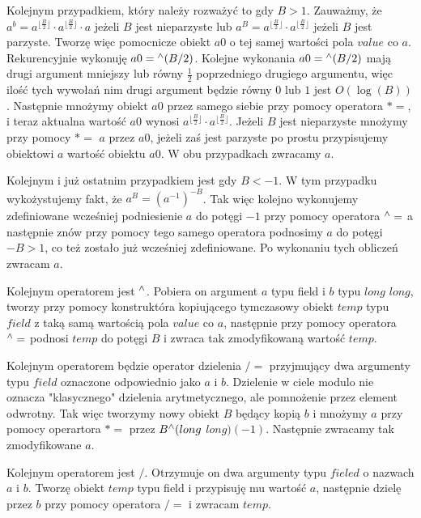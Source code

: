 \documentclass{article}
\begin{document}
Kolejnym przypadkiem, który należy rozważyć to gdy $B>1$. Zauważmy, że $a^b=a^{\lfloor\frac{B}{2} \rfloor} \cdot a^{\lfloor\frac{B}{2} \rfloor} \cdot a$
jeżeli $B$ jest nieparzyste lub $a^B=a^{\lfloor\frac{B}{2} \rfloor} \cdot a^{\lfloor\frac{B}{2} \rfloor}$ jeżeli $B$ jest parzyste.
Tworzę więc pomocnicze obiekt $a0$ o tej samej wartości pola $value$ co $a$. Rekurencyjnie
wykonuję $a0 =\textsuperscript{$\wedge$} (B/2)$. Kolejne wykonania $a0 =\textsuperscript{$\wedge$} (B/2)$
mają drugi argument mniejszy lub równy $\frac{1}{2}$ poprzedniego drugiego argumentu, więc ilość 
tych wywołań nim drugi argument będzie równy $0$ lub $1$ jest $O(\log(B))$. Następnie mnożymy obiekt $a0$ przez
samego siebie przy pomocy operatora $*=$, i teraz aktualna wartość $a0$ wynosi 
$a^{\lfloor \frac{B}{2}\rfloor} \cdot a^{\lfloor \frac{B}{2}\rfloor}$. Jeżeli $B$
jest nieparzyste mnożymy przy pomocy $*=$ $a$ przez $a0$, jeżeli zaś jest parzyste 
po prostu przypisujemy obiektowi $a$ wartość obiektu $a0$. W obu przypadkach zwracamy $a$.

Kolejnym i już ostatnim przypadkiem jest gdy $B < -1$. W tym przypadku wykożystujemy 
fakt, że $a^B=(a^{-1})^{-B}$. Tak więc kolejno wykonujemy zdefiniowane wcześniej 
podniesienie $a$ do potęgi $-1$ przy pomocy operatora $\textsuperscript{$\wedge$} =$ a następnie znów przy
pomocy tego samego operatora podnosimy $a$ do potęgi $-B>1$, co też zostało już wcześniej
zdefiniowane. Po wykonaniu tych obliczeń zwracam $a$.

Kolejnym operatorem jest $\textsuperscript{$\wedge$}$. Pobiera on argument $a$ typu field i $b$ typu $long$ $long$, tworzy
przy pomocy konstruktóra kopiującego tymczasowy obiekt $temp$ typu $field$ z taką samą wartością pola 
$value$ co $a$, następnie przy pomocy operatora $\textsuperscript{$\wedge$}=$ podnosi 
$temp$ do potęgi $B$ i zwraca tak zmodyfikowaną wartość $temp$.

Kolejnym operatorem będzie operator dzielenia $/=$ przyjmujący dwa argumenty typu 
$field$ oznaczone odpowiednio jako $a$ i $b$. Dzielenie w ciele modulo nie oznacza
"klasycznego" dzielenia arytmetycznego, ale pomnożenie przez element odwrotny. Tak więc tworzymy nowy obiekt $B$ będący kopią $b$ i mnożymy $a$ przy pomocy
operartora $*=$ przez $B\textsuperscript{$\wedge$}(long$ $long)(-1)$. Następnie zwracamy tak zmodyfikowane $a$.

Kolejnym operatorem jest $/$. Otrzymuje on dwa argumenty typu $fieled$ o nazwach $a$ i $b$. Tworzę obiekt $temp$ typu field i przypisuję mu wartość $a$, następnie dzielę przez $b$ przy pomocy 
operatora $/=$ i zwracam $temp$.
\end{document}
